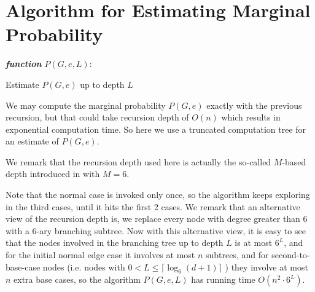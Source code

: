 
\section{Algorithm for Estimating Marginal Probability}

\IncMargin{1em}
\begin{algorithm}[H]
\emph{ \textbf{function} $P(G, e, L):$}
\BlankLine
{}
 \caption{Estimate $P(G,e)$ up to depth $L$}
\end{algorithm}
\DecMargin{1em}

We may compute the marginal probability $P(G, e)$ exactly with the previous recursion, but
that could take recursion depth of $O(n)$ which results in exponential computation time.
So here we use a truncated computation tree for an estimate of $P(G,e)$.

We remark that the recursion depth used here is actually the so-called $M$-based depth introduced in \cite{LLY12} with $M=6$. 


Note that the normal case is invoked only once, so the algorithm keeps exploring in the third cases, until it hits the first 2 cases. We remark that an alternative view of the recursion depth is, we replace every node with degree greater than 6 with a $6$-ary branching subtree.
Now with this alternative view, it is easy to see that the nodes involved in the branching tree up to depth $L$ is at most $6^L$,
and for the initial normal edge case it involves at most $n$ subtrees, and for second-to-base-case nodes (i.e. nodes with $0<L \leq \lceil \log_6{(d+1)} \rceil $ ) they involve at most $n$ extra base cases, 
so the algorithm $P(G,e,L)$ has running time $O(n^2 \cdot 6^L)$.
%

